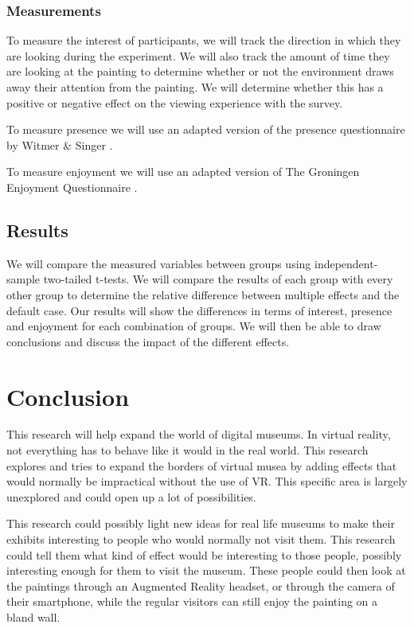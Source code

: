\documentclass[a4paper]{article}
\begin{document}
\subsubsection{Measurements}

To measure the interest of participants, we will track the direction in which they are looking during the experiment. We will also track the amount of time they are looking at the painting to determine whether or not the environment draws away their attention from the painting. We will determine whether this has a positive or negative effect on the viewing experience with the survey.

To measure presence we will use an adapted version of the presence questionnaire by Witmer \& Singer \cite{witmer}.

To measure enjoyment we will use an adapted version of The Groningen Enjoyment Questionnaire \cite{stevens}.

\subsection{Results}

We will compare the measured variables between groups using independent-sample two-tailed t-tests. We will compare the results of each group with every other group to determine the relative difference between multiple effects and the default case. Our results will show the differences in terms of interest, presence and enjoyment for each combination of groups. We will then be able to draw conclusions and discuss the impact of the different effects.


\section {Conclusion}
This research will help expand the world of digital museums. In virtual reality, not everything has to behave like it would in the real world. This research explores and tries to expand the borders of virtual musea by adding effects that would normally be impractical without the use of VR. This specific area is largely unexplored and could open up a lot of possibilities.

This research could possibly light new ideas for real life museums to make their exhibits interesting to people who would normally not visit them. This research could tell them what kind of effect would be interesting to those people, possibly interesting enough for them to visit the museum. These people could then look at the paintings through an Augmented Reality headset, or through the camera of their smartphone, while the regular visitors can still enjoy the painting on a bland wall. 
\end{document}
